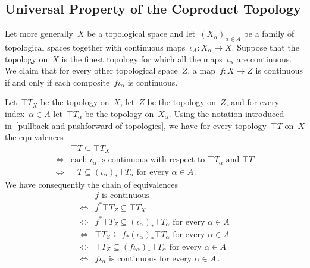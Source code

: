 \subsection{Universal Property of the Coproduct Topology}

Let more generally~$X$ be a topological space and let~$(X_α)_{α ∈ A}$ be a family of topological spaces together with continuous maps~$ι_A \colon X_α \to X$.
Suppose that the topology on~$X$ is the finest topology for which all the maps~$ι_α$ are continuous.
We claim that for every other topological space~$Z$, a map~$f \colon X \to Z$ is continuous if and only if each composite~$f ι_α$ is continuous.

Let~$\top{T}_X$ be the topology on~$X$, let~$Z$ be the topology on~$Z$, and for every index~$α ∈ A$ let~$\top{T}_α$ be the topology on~$X_α$.
Using the notation introduced in~\cref{pullback and pushforward of topologies}, we have for every topology~$\top{T}$ on~$X$ the equivalences
\begin{align*}
	{}&
	\top{T} ⊆ \top{T}_X
	\\
	\iff{}&
	\text{each~$ι_α$ is continuous with respect to~$\top{T}_α$ and~$\top{T}$}
	\\
	\iff{}&
	\text{$\top{T} ⊆ (ι_α)_* \top{T}_α$ for every~$α ∈ A$} \,.
\end{align*}
We have consequently the chain of equivalences
\begin{align*}
	{}&
	\text{$f$ is continuous}
	\\
	\iff{}&
	f^* \top{T}_Z ⊆ \top{T}_X
	\\
	\iff{}&
	\text{$f^* \top{T}_Z ⊆ (ι_α)_* \top{T}_α$ for every~$α ∈ A$}
	\\
	\iff{}&
	\text{$\top{T}_Z ⊆ f_* (ι_α)_* \top{T}_α$ for every~$α ∈ A$}
	\\
	\iff{}&
	\text{$\top{T}_Z ⊆ (f ι_α)_* \top{T}_α$ for every~$α ∈ A$}
	\\
	\iff{}&
	\text{$f ι_α$ is continuous for every~$α ∈ A$} \,.
\end{align*}
